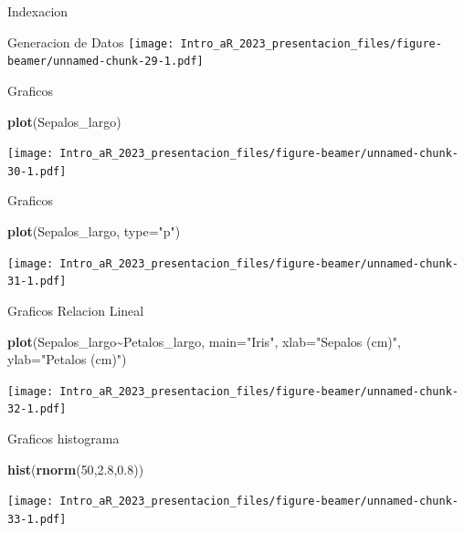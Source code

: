 \documentclass[
  ignorenonframetext,
]{beamer}
\newenvironment{Shaded}{\begin{snugshade}}{\end{snugshade}}
\newcommand{\AttributeTok}[1]{\textcolor[rgb]{0.13,0.29,0.53}{#1}}
\newcommand{\DecValTok}[1]{\textcolor[rgb]{0.00,0.00,0.81}{#1}}
\newcommand{\FloatTok}[1]{\textcolor[rgb]{0.00,0.00,0.81}{#1}}
\newcommand{\FunctionTok}[1]{\textcolor[rgb]{0.13,0.29,0.53}{\textbf{#1}}}
\newcommand{\NormalTok}[1]{#1}
\newcommand{\SpecialCharTok}[1]{\textcolor[rgb]{0.81,0.36,0.00}{\textbf{#1}}}
\newcommand{\StringTok}[1]{\textcolor[rgb]{0.31,0.60,0.02}{#1}}
\begin{document}
\begin{frame}[fragile]{Indexacion}
\begin{block}{Generacion de Datos}
\protect\hypertarget{generacion-de-datos-2}{}
\texttt{[image: Intro\_aR\_2023\_presentacion\_files/figure-beamer/unnamed-chunk-29-1.pdf]}
\end{block}

\begin{block}{Graficos}
\protect\hypertarget{graficos}{}
\begin{Shaded}
\begin{Highlighting}[]
\FunctionTok{plot}\NormalTok{(Sepalos\_largo)}
\end{Highlighting}
\end{Shaded}

\texttt{[image: Intro\_aR\_2023\_presentacion\_files/figure-beamer/unnamed-chunk-30-1.pdf]}
\end{block}

\begin{block}{Graficos}
\protect\hypertarget{graficos-1}{}
\begin{Shaded}
\begin{Highlighting}[]
\FunctionTok{plot}\NormalTok{(Sepalos\_largo, }\AttributeTok{type=}\StringTok{"p"}\NormalTok{)}
\end{Highlighting}
\end{Shaded}

\texttt{[image: Intro\_aR\_2023\_presentacion\_files/figure-beamer/unnamed-chunk-31-1.pdf]}
\end{block}

\begin{block}{Graficos}
\protect\hypertarget{graficos-2}{}
Relacion Lineal

\begin{Shaded}
\begin{Highlighting}[]
\FunctionTok{plot}\NormalTok{(Sepalos\_largo}\SpecialCharTok{\textasciitilde{}}\NormalTok{Petalos\_largo, }\AttributeTok{main=}\StringTok{"Iris"}\NormalTok{, }\AttributeTok{xlab=}\StringTok{"Sepalos (cm)"}\NormalTok{, }\AttributeTok{ylab=}\StringTok{"Petalos (cm)"}\NormalTok{)}
\end{Highlighting}
\end{Shaded}

\texttt{[image: Intro\_aR\_2023\_presentacion\_files/figure-beamer/unnamed-chunk-32-1.pdf]}
\end{block}

\begin{block}{Graficos}
\protect\hypertarget{graficos-3}{}
histograma

\begin{Shaded}
\begin{Highlighting}[]
\FunctionTok{hist}\NormalTok{(}\FunctionTok{rnorm}\NormalTok{(}\DecValTok{50}\NormalTok{,}\FloatTok{2.8}\NormalTok{,}\FloatTok{0.8}\NormalTok{))}
\end{Highlighting}
\end{Shaded}

\texttt{[image: Intro\_aR\_2023\_presentacion\_files/figure-beamer/unnamed-chunk-33-1.pdf]}
\end{block}
\end{frame}
\end{document}
